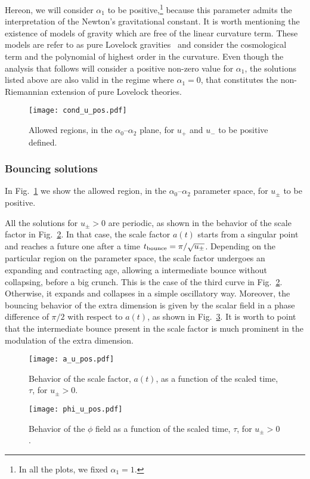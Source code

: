 \documentclass[aps,prd,12pt,superscriptaddress,showpacs,showkeys,longbibliography,reprint,nofootinbib]{revtex4-1}
\begin{document}
Hereon, we will consider $\alpha_1$ to be positive,\footnote{In all the plots, we fixed $\alpha_1 = 1$.} because this parameter admits the interpretation of the Newton's gravitational constant. It is worth mentioning the existence of models of gravity which are free of the linear curvature term. These models are refer to as pure Lovelock gravities~\cite{Cai:2006pq} and consider the cosmological term and the polynomial of highest order in the curvature. Even though the analysis that follows will consider a positive non-zero value for $\alpha_1$, the solutions listed above are also valid in the regime where $\alpha_1=0$, that constitutes the non-Riemannian extension of pure Lovelock theories.
\begin{figure}[H]
  \texttt{[image: cond\_u\_pos.pdf]}
  \caption{Allowed regions, in the $\alpha_0$--$\alpha_2$ plane, for $u_+$ and $u_-$ to be positive defined.}
  \label{cond_u_pos}
\end{figure}


\subsubsection{Bouncing solutions}

In Fig.~\ref{cond_u_pos} we show the allowed region, in the $\alpha_0$--$\alpha_2$ parameter space, for $u_\pm$ to be positive. 


All the solutions for $u_\pm>0$ are periodic, as shown in the behavior of the scale factor in Fig.~\ref{a_u_pos}. In that case, the scale factor $a(t)$ starts from a singular point and reaches a future one after a time $t_{\rm bounce}=\pi/\sqrt{u_\pm}$. Depending on the particular region on the parameter space, the scale factor undergoes an expanding and contracting age, allowing a intermediate bounce without collapsing, before a big crunch. This is the case of the third curve in Fig.~\ref{a_u_pos}. Otherwise, it expands and collapses in a {simple} oscillatory way.
Moreover, the bouncing behavior of the extra dimension is given by the scalar field in a phase difference of $\pi/2$ with respect to $a(t)$, as shown in Fig.~\ref{phi_u_pos}. It is worth to point that the {intermediate bounce} present in the scale factor is much prominent in the modulation of the extra dimension.
\begin{figure}[H]
  \texttt{[image: a\_u\_pos.pdf]}
  \caption{Behavior of the scale factor, \(a(t)\), as a function of the scaled time, $\tau$, for $u_\pm > 0$.}
  \label{a_u_pos}
\end{figure}
\begin{figure}[H]
  \texttt{[image: phi\_u\_pos.pdf]}
  \caption{Behavior of the $\phi$ field as a function of the scaled time, $\tau$, for $u_\pm > 0$.}
  \label{phi_u_pos}
\end{figure}
\end{document}

